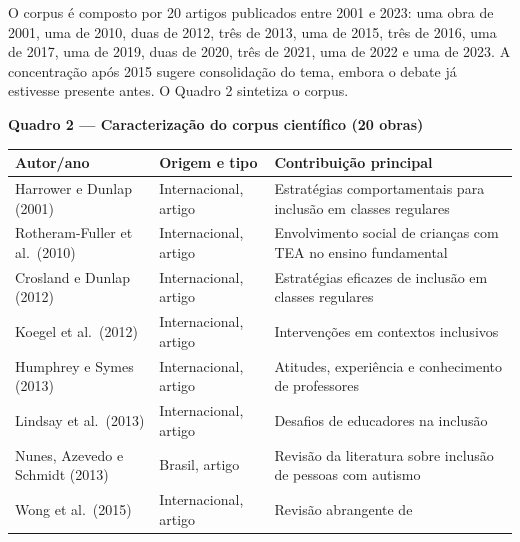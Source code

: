 O corpus é composto por 20 artigos publicados entre 2001 e 2023: uma
obra de 2001, uma de 2010, duas de 2012, três de 2013, uma de 2015, três
de 2016, uma de 2017, uma de 2019, duas de 2020, três de 2021, uma de
2022 e uma de 2023. A concentração após 2015 sugere consolidação do
tema, embora o debate já estivesse presente antes. O Quadro 2 sintetiza
o corpus.


\textbf{Quadro 2 --- Caracterização do corpus científico (20 obras)}

\begingroup\small

\begin{longtable}[]{@{}
  >{\raggedright\arraybackslash}p{}
  >{\raggedright\arraybackslash}p{}
  >{\raggedright\arraybackslash}p{}@{}}
\toprule\noalign{}
\begin{minipage}[b]{\linewidth}\raggedright
Autor/ano
\end{minipage} & \begin{minipage}[b]{\linewidth}\raggedright
Origem e tipo
\end{minipage} & \begin{minipage}[b]{\linewidth}\raggedright
Contribuição principal
\end{minipage} \\
\midrule\noalign{}
\endhead
\bottomrule\noalign{}
\endlastfoot
Harrower e Dunlap (2001) & Internacional, artigo & Estratégias
comportamentais para inclusão em classes regulares \\
Rotheram-Fuller et al.~(2010) & Internacional, artigo & Envolvimento
social de crianças com TEA no ensino fundamental \\
Crosland e Dunlap (2012) & Internacional, artigo & Estratégias eficazes
de inclusão em classes regulares \\
Koegel et al.~(2012) & Internacional, artigo & Intervenções em contextos
inclusivos \\
Humphrey e Symes (2013) & Internacional, artigo & Atitudes, experiência
e conhecimento de professores \\
Lindsay et al.~(2013) & Internacional, artigo & Desafios de educadores
na inclusão \\
Nunes, Azevedo e Schmidt (2013) & Brasil, artigo & Revisão da literatura
sobre inclusão de pessoas com autismo \\
Wong et al.~(2015) & Internacional, artigo & Revisão abrangente de

\end{longtable}
